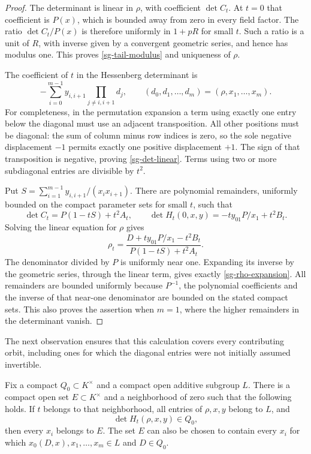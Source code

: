 \begin{proof}
The determinant is linear in $\rho$, with coefficient
$\det C_t$.  At $t=0$ that coefficient is $P(x)$, which is
bounded away from zero in every field factor.  The ratio
$\det C_t/P(x)$ is therefore uniformly in $1+pR$ for small $t$.
Such a ratio is a unit of $R$, with inverse given by a convergent
geometric series, and hence has modulus one.  This proves
\eqref{sg-tail-modulus} and uniqueness of $\rho$.

The coefficient of $t$ in the Hessenberg determinant is
\begin{equation}\label{sg-det-linear}
 -\sum_{i=0}^{m-1}y_{i,i+1}
                 \prod_{j\ne i,i+1}d_j,
 \qquad (d_0,d_1,\ldots,d_m)=(\rho,x_1,\ldots,x_m).
\end{equation}
For completeness, in the permutation expansion a term using
exactly one entry below the diagonal must use an adjacent
transposition.  All other positions must be diagonal: the
sum of column minus row indices is zero, so the sole negative
displacement $-1$ permits exactly one positive displacement
$+1$.  The sign of that transposition is negative, proving
\eqref{sg-det-linear}.  Terms using two or more subdiagonal
entries are divisible by $t^2$.

Put $S=\sum_{i=1}^{m-1}y_{i,i+1}/(x_ix_{i+1})$.
There are polynomial remainders, uniformly bounded on the
compact parameter sets for small $t$, such that
\[
 \det C_t=P(1-tS)+t^2 A_t,
 \qquad
 \det H_t(0,x,y)=-t y_{01}P/x_1+t^2 B_t.
\]
Solving the linear equation for $\rho$ gives
\[
 \rho_t=
 \frac{D+t y_{01}P/x_1-t^2B_t}{P(1-tS)+t^2A_t}.
\]
The denominator divided by $P$ is uniformly near one.
Expanding its inverse by the geometric series, through the
linear term, gives exactly \eqref{sg-rho-expansion}.
All remainders are bounded uniformly because $P^{-1}$, the
polynomial coefficients and the inverse of that near-one
denominator are bounded on the stated compact sets.  This also
proves the assertion when $m=1$, where the higher remainders
in the determinant vanish.
\end{proof}

The next observation ensures that this calculation covers every
contributing orbit, including ones for which the diagonal entries
were not initially assumed invertible.

\begin{lemma}\label{sg-nonzero-diagonals}
Fix a compact $Q_0\subset K^\times$ and a compact open additive
subgroup $L$.  There is a compact open set $E\subset K^\times$
and a neighborhood of zero such that the following holds.
If $t$ belongs to that neighborhood, all entries of
$\rho,x,y$ belong to $L$, and
\[
                    \det H_t(\rho,x,y)\in Q_0,
\]
then every $x_i$ belongs to $E$.
The set $E$ can also be chosen to contain every $x_i$ for which
$x_0(D,x),x_1,\ldots,x_m\in L$ and $D\in Q_0$.
\end{lemma}


